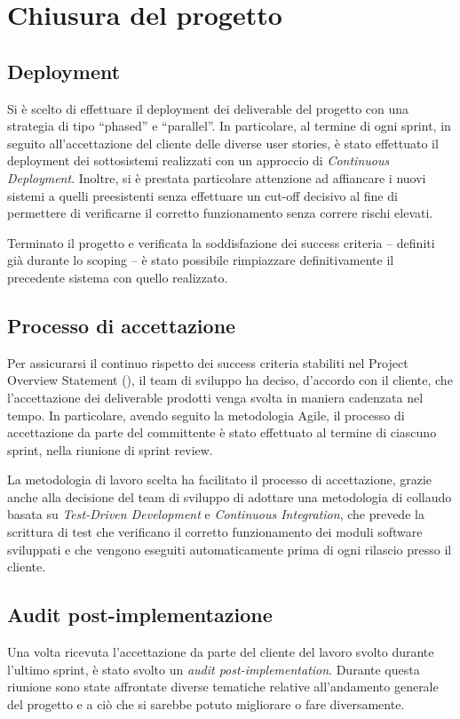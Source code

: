 \chapter{Chiusura del progetto}

\section{Deployment}
Si è scelto di effettuare il deployment dei deliverable del progetto con una strategia di tipo ``phased'' e ``parallel''. In particolare, al termine di ogni sprint, in seguito all'accettazione del cliente delle diverse user stories, è stato effettuato il deployment dei sottosistemi realizzati con un approccio di \emph{Continuous Deployment}.
Inoltre, si è prestata particolare attenzione ad affiancare i nuovi sistemi a quelli preesistenti senza effettuare un cut-off decisivo al fine di permettere di verificarne il corretto funzionamento senza correre rischi elevati.

Terminato il progetto e verificata la soddisfazione dei success criteria -- definiti già durante lo scoping -- è stato possibile rimpiazzare definitivamente il precedente sistema con quello realizzato.

\section{Processo di accettazione}
Per assicurarsi il continuo rispetto dei success criteria stabiliti nel Project Overview Statement (), il team di sviluppo ha deciso, d'accordo con il cliente, che l'accettazione dei deliverable prodotti venga svolta in maniera cadenzata nel tempo.
In particolare, avendo seguito la metodologia Agile, il processo di accettazione da parte del committente è stato effettuato al termine di ciascuno sprint, nella riunione di sprint review.

La metodologia di lavoro scelta ha facilitato il processo di accettazione, grazie anche alla decisione del team di sviluppo di adottare una metodologia di collaudo basata su \emph{Test-Driven Development} e \emph{Continuous Integration}, che prevede la scrittura di test che verificano il corretto funzionamento dei moduli software sviluppati e che vengono eseguiti automaticamente prima di ogni rilascio presso il cliente.

\section{Audit post-implementazione}
Una volta ricevuta l'accettazione da parte del cliente del lavoro svolto durante l'ultimo sprint, è stato svolto un \emph{audit post-implementation}.
Durante questa riunione sono state affrontate diverse tematiche relative all'andamento generale del progetto e a ciò che si sarebbe potuto migliorare o fare diversamente.

